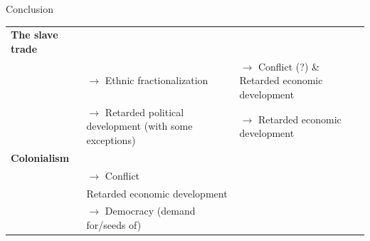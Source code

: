 \documentclass[professionalfont]{beamer}
\begin{document}
\begin{frame}{Conclusion}
	\begin{table}
	\begin{tabularx}{\textwidth}{>{\centering\arraybackslash}X>{\centering\arraybackslash}X>{\centering\arraybackslash}X}
		\textbf{The slave trade} & & \\
					 & $\rightarrow$ Ethnic fractionalization & $\rightarrow$ Conflict (?) \& Retarded economic
		development \\	
					 & $\rightarrow$ Retarded political development (with
		some exceptions) & $\rightarrow$ Retarded economic development \\
		\textbf{Colonialism} & & \\
				     & $\rightarrow$ Conflict & \\
			& Retarded economic development & \\
			& $\rightarrow$ Democracy (demand for/seeds of) \\
	\end{tabularx}
	\end{table}
\end{frame}
\end{document}
